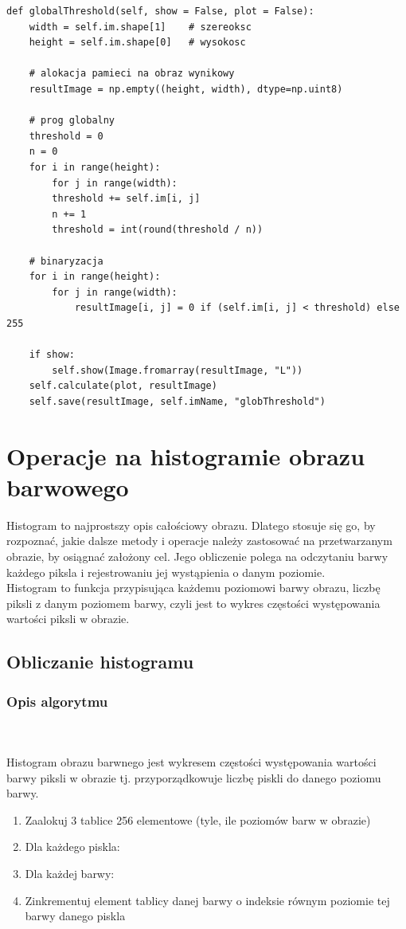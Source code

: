 \documentclass[final,a4paper,openany,12pt]{mwbk}
\begin{document}
\begin{lstlisting}[caption=Progowanie globalne]
def globalThreshold(self, show = False, plot = False):
	width = self.im.shape[1]    # szereoksc
	height = self.im.shape[0]   # wysokosc
	
	# alokacja pamieci na obraz wynikowy
	resultImage = np.empty((height, width), dtype=np.uint8)
	
	# prog globalny
	threshold = 0
	n = 0
	for i in range(height):
		for j in range(width):
		threshold += self.im[i, j]
		n += 1
		threshold = int(round(threshold / n))
	
	# binaryzacja
	for i in range(height):
		for j in range(width):
			resultImage[i, j] = 0 if (self.im[i, j] < threshold) else 255
	
	if show:
		self.show(Image.fromarray(resultImage, "L"))
	self.calculate(plot, resultImage)
	self.save(resultImage, self.imName, "globThreshold")
\end{lstlisting}
\newpage






\chapter{Operacje na histogramie obrazu barwowego}
Histogram to najprostszy opis całościowy obrazu. Dlatego stosuje się go, by rozpoznać, jakie dalsze metody i operacje należy zastosować na przetwarzanym obrazie, by osiągnać założony cel. Jego obliczenie polega na odczytaniu barwy każdego piksla i rejestrowaniu jej wystąpienia o danym poziomie.\\
Histogram to funkcja przypisująca każdemu poziomowi barwy obrazu, liczbę piksli z danym poziomem barwy, czyli jest to wykres częstości występowania wartości piksli w obrazie.
\newpage

\section{Obliczanie histogramu}
\subsection*{Opis algorytmu}
\hfill
\\\\
\indent Histogram obrazu barwnego jest wykresem częstości występowania wartości barwy piksli w obrazie tj.
przyporządkowuje liczbę piskli do danego poziomu barwy.\newline
\begin{enumerate}
	\item Zaalokuj 3 tablice 256 elementowe (tyle, ile poziomów barw w obrazie)
	\item Dla każdego piskla:
	\item Dla każdej barwy:
	\item Zinkrementuj element tablicy danej barwy o indeksie równym poziomie tej barwy danego piskla
\end{enumerate}
\end{document}
